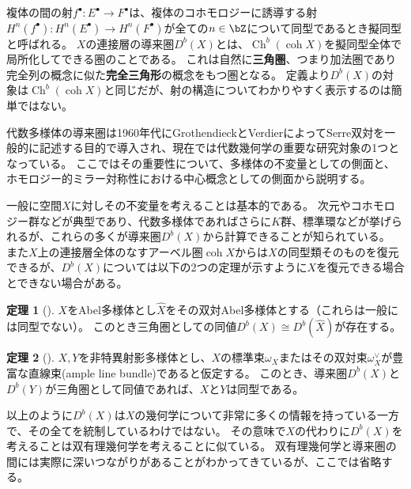 \documentclass[uplatex,11pt,a4paper,dvipdfmx]{jsarticle}
\numberwithin{equation}{section}
\theoremstyle{definition}
\newtheorem{theorem}{定理}[section]
\DeclareMathOperator{\Ch}{\mathrm{Ch}}
\DeclareMathOperator{\coh}{\mathrm{coh}}
\begin{document}
複体の間の射$f^\bullet \colon E^\bullet \to F^\bullet$は、複体のコホモロジーに誘導する射$H^n(f^\bullet) \colon H^n(E^\bullet) \to H^n(F^\bullet)$が全ての$n \in \bZ$について同型であるとき擬同型と呼ばれる。
$X$の連接層の導来圏$D^b(X)$とは、$\Ch^b(\coh X)$を擬同型全体で局所化してできる圏のことである。
これは自然に\textbf{三角圏}、つまり加法圏であり完全列の概念に似た\textbf{完全三角形}の概念をもつ圏となる。
定義より$D^b(X)$の対象は$\Ch^b(\coh X)$と同じだが、射の構造についてわかりやすく表示するのは簡単ではない。

代数多様体の導来圏は1960年代にGrothendieckとVerdierによってSerre双対を一般的に記述する目的で導入され、現在では代数幾何学の重要な研究対象の1つとなっている。
ここではその重要性について、多様体の不変量としての側面と、ホモロジー的ミラー対称性における中心概念としての側面から説明する。

一般に空間$X$に対しその不変量を考えることは基本的である。
次元やコホモロジー群などが典型であり、代数多様体であればさらに$K$群、標準環などが挙げられるが、これらの多くが導来圏$D^b(X)$から計算できることが知られている。
また$X$上の連接層全体のなすアーベル圏$\coh X$からは$X$の同型類そのものを復元できるが、$D^b(X)$については以下の2つの定理が示すように$X$を復元できる場合とできない場合がある。
\begin{theorem}[\cite{MR607081}]\label{mukai}
    $X$をAbel多様体とし$\hat{X}$をその双対Abel多様体とする（これらは一般には同型でない）。
    このとき三角圏としての同値$D^b(X) \cong D^b(\hat{X})$が存在する。
\end{theorem}
\begin{theorem}[\cite{MR1818984}]
    $X, Y$を非特異射影多様体とし、$X$の標準束$\omega_X$またはその双対束$\omega_X^\vee$が豊富な直線束(ample line bundle)であると仮定する。
    このとき、導来圏$D^b(X)$と$D^b(Y)$が三角圏として同値であれば、$X$と$Y$は同型である。
\end{theorem}
以上のように$D^b(X)$は$X$の幾何学について非常に多くの情報を持っている一方で、その全てを統制しているわけではない。
その意味で$X$の代わりに$D^b(X)$を考えることは双有理幾何学を考えることに似ている。
双有理幾何学と導来圏の間には実際に深いつながりがあることがわかってきているが、ここでは省略する。
\end{document}
